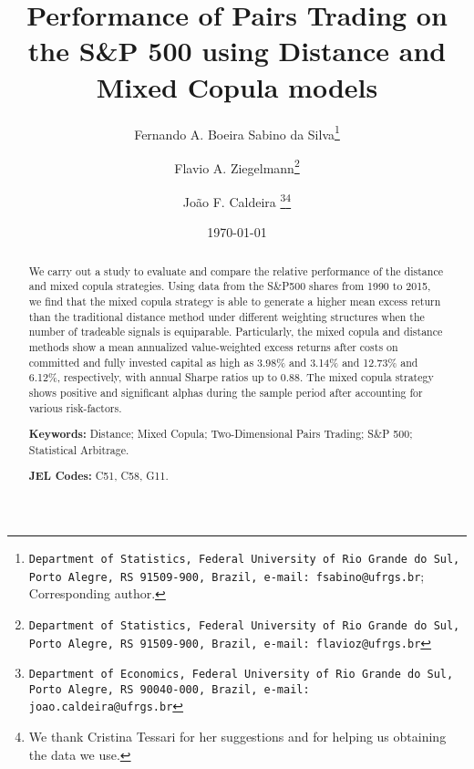 \documentclass[a4paper]{article}
\begin{document}
	
	
	\makeatletter
	\def\@maketitle{%
		\newpage
		\null
		\vskip 2em%
		\begin{center}%
			\let \footnote \thanks
			{\Large\bfseries \@title \par}%
			\vskip 1.5em%
			{\normalsize
				\lineskip .5em%
				\begin{tabular}[t]{c}%
					\@author
				\end{tabular}\par}%
			\vskip 1em%
			{\normalsize \@date}%
		\end{center}%
		\par
		\vskip 1.5em}
	\makeatother
	
	\title{Performance of Pairs Trading on the S\&P 500 using Distance and Mixed Copula models}
	\author[]{ Fernando A. Boeira Sabino da Silva\thanks{\texttt{Department of Statistics, Federal University of Rio Grande do Sul, Porto Alegre, RS 91509-900, Brazil, e-mail: fsabino@ufrgs.br}; Corresponding author.}}
	\author[]{Flavio A. Ziegelmann\thanks{\texttt{Department of Statistics, Federal University of Rio Grande do Sul, Porto Alegre, RS 91509-900, Brazil, e-mail: flavioz@ufrgs.br}}}
	\author[]{João F. Caldeira \thanks{\texttt{Department of Economics, Federal University of Rio Grande do Sul, Porto Alegre, RS 90040-000, Brazil, e-mail: joao.caldeira@ufrgs.br}}\thanks{We thank Cristina Tessari for her suggestions and for helping us obtaining the data we use.}}
	\affil[]{}
	\date{\today}
	\maketitle
	
	
	\begin{abstract}
		We carry out a study to evaluate and compare the relative performance of the distance and mixed copula strategies. Using data from the S\&P500 shares from 1990 to 2015, we find that the mixed copula strategy is able to generate a higher mean excess return than the traditional distance method under different weighting structures when the number of tradeable signals is equiparable. Particularly, the mixed copula and distance methods show a mean annualized value-weighted excess returns after costs on committed and fully invested capital as high as 3.98\% and 3.14\% and 12.73\% and 6.12\%, respectively, with annual Sharpe ratios up to 0.88. The mixed copula strategy shows positive and significant alphas during the sample period after accounting for various risk-factors.
		
		\smallskip
		
		\noindent \textbf{Keywords:} Distance; Mixed Copula; Two-Dimensional Pairs Trading; S\&P 500; Statistical Arbitrage.
		
		\noindent \textbf{JEL Codes:} C51, C58, G11.
	\end{abstract}
	
\end{document}
